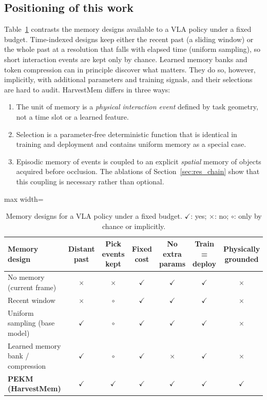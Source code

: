 \subsection{Positioning of this work}
Table~\ref{tab:positioning} contrasts the memory designs available to a VLA policy under a fixed budget. Time-indexed designs keep either the recent past (a sliding window) or the whole past at a resolution that falls with elapsed time (uniform sampling), so short interaction events are kept only by chance. Learned memory banks and token compression can in principle discover what matters. They do so, however, implicitly, with additional parameters and training signals, and their selections are hard to audit. HarvestMem differs in three ways:
\begin{enumerate}
\item The unit of memory is a \emph{physical interaction event} defined by task geometry, not a time slot or a learned feature.
\item Selection is a parameter-free deterministic function that is identical in training and deployment and contains uniform memory as a special case.
\item Episodic memory of events is coupled to an explicit \emph{spatial} memory of objects acquired before occlusion. The ablations of Section~\ref{sec:res_chain} show that this coupling is necessary rather than optional.
\end{enumerate}

\begin{table}[t]
\centering
\caption{Memory designs for a VLA policy under a fixed budget. $\checkmark$: yes; $\times$: no; $\circ$: only by chance or implicitly.}
\label{tab:positioning}
\footnotesize
\begin{adjustbox}{max width=\textwidth}\begin{tabular}{lcccccc}
\toprule
Memory design & Distant past & Pick events kept & Fixed cost & No extra params & Train = deploy & Physically grounded\\
\midrule
No memory (current frame) & $\times$ & $\times$ & $\checkmark$ & $\checkmark$ & $\checkmark$ & $\times$\\
Recent window & $\times$ & $\circ$ & $\checkmark$ & $\checkmark$ & $\checkmark$ & $\times$\\
Uniform sampling (base model) & $\checkmark$ & $\circ$ & $\checkmark$ & $\checkmark$ & $\checkmark$ & $\times$\\
Learned memory bank / compression & $\checkmark$ & $\circ$ & $\checkmark$ & $\times$ & $\checkmark$ & $\times$\\
\textbf{PEKM (HarvestMem)} & $\checkmark$ & $\checkmark$ & $\checkmark$ & $\checkmark$ & $\checkmark$ & $\checkmark$\\
\bottomrule
\end{tabular}\end{adjustbox}
\end{table}
